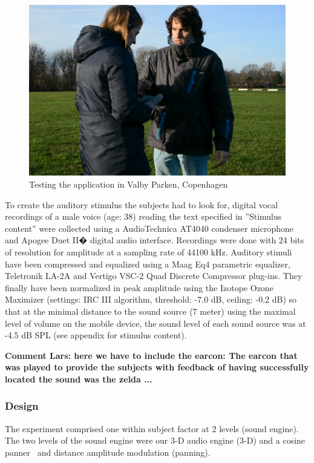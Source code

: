 \documentclass[journal]{IEEEtran}
\begin{document}
\begin{figure}[h!]
\centering 
\includegraphics[scale=0.18]{graphics/experiment_AYL} 
\caption{Testing the application in Valby Parken, Copenhagen} 
\label{fig:testing} 
\end{figure}

To create the auditory stimulus the subjects had to look for, digital vocal recordings of a male voice (age: 38) reading the text specified in ''Stimulus content'' were collected using a AudioTechnica AT4040 condenser microphone and Apogee Duet II� digital audio interface. Recordings were done with 24 bits of resolution for amplitude at a sampling rate of 44100 kHz. Auditory stimuli have been compressed and equalized using a Maag Eq4 parametric equalizer, Teletronik LA-2A and Vertigo VSC-2 Quad Discrete Compressor plug-ins. They finally have been normalized in peak amplitude using the Izotope Ozone Maximizer (settings: IRC III algorithm, threshold: -7.0 dB, ceiling: -0.2 dB) so that at the minimal distance to the sound source (7 meter) using the maximal level of volume on the mobile device, the sound level of each sound source was at -4.5 dB SPL (see appendix for stimulus content).

\textbf{Comment Lars: here we have to include the earcon: The earcon that was played to provide the subjects with feedback of having successfully located the sound was the zelda ...}

\subsubsection{Design}
The experiment comprised one within subject factor at 2 levels (sound engine). The two levels of the sound engine were our 3-D audio engine (3-D) and a cosine panner~\cite{AndyFarnell2010} and distance amplitude modulation (panning).
\end{document}
